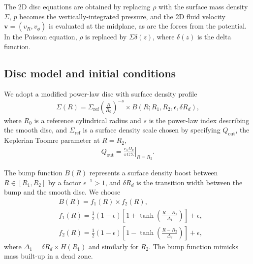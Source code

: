 


The 2D disc equations are obtained by replacing $\rho$ with the surface
mass density $\Sigma$, $p$ becomes the vertically-integrated pressure, 
and the 2D fluid
velocity $\bm{v}=(v_R,v_\phi)$ is evaluated at the midplane, as are
the forces from the potential. In the Poisson equation, $\rho$ is
replaced by $\Sigma\delta(z)$, where $\delta(z)$ is the
delta function. 

\subsection{Disc model and initial conditions}
We adopt a modified power-law disc with surface
density profile 
\begin{align}
  \Sigma(R) = \Sigma_\mathrm{ref} \left(\frac{R}{R_0}\right)^{-s}\times B(R;
  R_{1}, R_{2}, \epsilon, \delta R_d), 
\end{align}
where $R_0$ is a reference cylindrical radius and $s$ is the power-law
index describing the smooth disc, and $\Sigma_\mathrm{ref}$ is a
surface density scale chosen by specifying $Q_\mathrm{out}$,
the Keplerian Toomre parameter at $R=R_{2}$,
\begin{align}
  Q_\mathrm{out} = \left.\frac{c_s\Omega_k}{\pi G
    \Sigma}\right|_{R=R_{2}}. 
\end{align}

The bump function
$B(R)$ represents a surface density boost between
$R\in[R_{1},R_{2}]$ by a factor $\epsilon^{-1}>1$,
and $\delta R_d$ is the transition width between the bump and the
smooth disc. We choose 
\begin{align}
  &B(R) = f_1(R)\times f_2(R),\\
  &f_1(R) = \frac{1}{2}\left(1 - \epsilon\right)\left[1 +
    \tanh\left(\frac{R-R_{1}}{\Delta_1}\right)\right]  + \epsilon,\\
  &f_2(R) = \frac{1}{2}\left(1 - \epsilon\right)\left[1 -
    \tanh\left(\frac{R-R_{2}}{\Delta_2}\right)\right]  + \epsilon,
\end{align}
where $\Delta_1 = \delta R_d \times H(R_{1})$ and similarly for
$R_{2}$. The bump function mimicks mass built-up in a dead zone.


